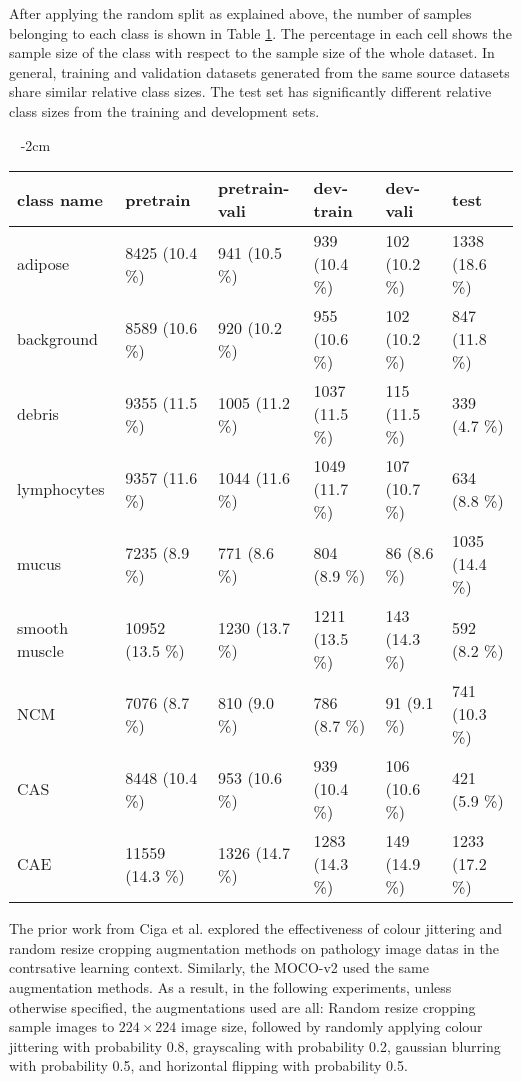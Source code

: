 \documentclass[12pt,twoside]{report}
\begin{document}
After applying the random split as explained above, the number of samples belonging to each class is shown in Table \ref{tab:dataset_balance}. The percentage in each cell shows the sample size of the class with respect to the sample size of the whole dataset. In general, training and validation datasets generated from the same source datasets share similar relative class sizes. The test set has significantly different relative class sizes from the training and development sets. \\

\begin{table}[]\ 
    \centering
    \addtolength{\leftskip} {-2cm}
    \addtolength{\rightskip}{-2cm}
    \begin{tabular}{|l|l|l|l|l|l|}
    \toprule
    class name & pretrain & pretrain-vali & dev-train & dev-vali & test \\
    \hline
    adipose & 8425 (10.4 \%) & 941 (10.5 \%) & 939 (10.4 \%) & 102 (10.2 \%) & 1338 (18.6 \%) \\
    background & 8589 (10.6 \%) & 920 (10.2 \%) & 955 (10.6 \%) & 102 (10.2 \%) & 847 (11.8 \%) \\
    debris & 9355 (11.5 \%) & 1005 (11.2 \%) & 1037 (11.5 \%) & 115 (11.5 \%) & 339 (4.7 \%) \\
    lymphocytes & 9357 (11.6 \%) & 1044 (11.6 \%) & 1049 (11.7 \%) & 107 (10.7 \%) & 634 (8.8 \%) \\
    mucus & 7235 (8.9 \%) & 771 (8.6 \%) & 804 (8.9 \%) & 86 (8.6 \%) & 1035 (14.4 \%) \\
    smooth muscle & 10952 (13.5 \%) & 1230 (13.7 \%) & 1211 (13.5 \%) & 143 (14.3 \%) & 592 (8.2 \%) \\
    NCM & 7076 (8.7 \%) & 810 (9.0 \%) & 786 (8.7 \%) & 91 (9.1 \%) & 741 (10.3 \%) \\
    CAS & 8448 (10.4 \%) & 953 (10.6 \%) & 939 (10.4 \%) & 106 (10.6 \%) & 421 (5.9 \%) \\
    CAE & 11559 (14.3 \%) & 1326 (14.7 \%) & 1283 (14.3 \%) & 149 (14.9 \%) & 1233 (17.2 \%) \\
    \bottomrule
    \end{tabular}
    \captionsetup{type=table}
    \label{tab:dataset_balance}
\end{table}

The prior work from Ciga et al. \cite{sslhistopathology} explored the effectiveness of colour jittering and random resize cropping augmentation methods on pathology image datas in the contrsative learning context. Similarly, the MOCO-v2 \cite{mocov2} used the same augmentation methods. As a result, in the following experiments, unless otherwise specified, the augmentations used are all: Random resize cropping sample images to $224 \times 224$ image size, followed by randomly applying colour jittering with probability 0.8, grayscaling with probability 0.2, gaussian blurring with probability 0.5, and horizontal flipping with probability 0.5. 
\end{document}
